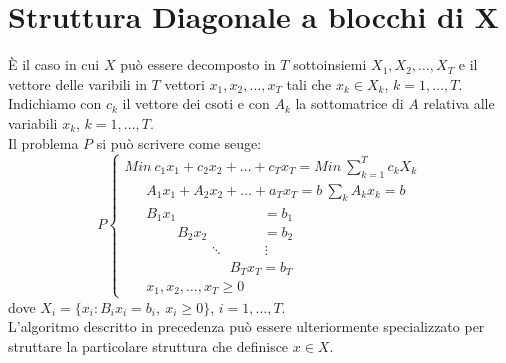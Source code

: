 \section{Struttura Diagonale a blocchi di X}
È il caso in cui $X$ può essere decomposto in $T$ sottoinsiemi $X_{1},X_{2},\dots,X_{T}$ e il vettore delle varibili in $T$ vettori $x_{1},x_{2},\dots,x_{T}$ tali che $x_{k}\in X_{k}$, $k=1,\dots,T$.\\
Indichiamo con $c_{k}$ il vettore dei csoti e con $A_{k}$ la sottomatrice di $A$ relativa alle variabili $x_{k}$, $k=1,\dots,T$.\\
Il problema $P$ si può scrivere come seuge:
\begin{equation*}
	P
	\begin{cases}
	Min\ c_{1}x_{1}+c_{2}x_{2}+\dots+c_{T}x_{T}=Min\ \sum_{k=1}^{T}c_{k}X_{k} \\
	\ \ \ \ \ \ \ A_{1}x_{1}+A_{2}x_{2}+\dots+a_{T}x_{T}=b\ \sum_{k}A_{k}x_{k}=b \\
	\ \ \ \ \ \ \ B_{1}x_{1}\ \ \ \ \ \ \ \ \ \ \ \ \ \ \ \ \ \ \ \ \ \ \ \ \ \ \ \ =b_{1} \\
	\ \ \ \ \ \ \ \ \ \ \ \ \ \ \ \ \ B_{2}x_{2}\ \ \ \ \ \ \ \ \ \ \ \ \ \ \ \ \ \ =b_{2} \\
	\ \ \ \ \ \ \ \ \ \ \ \ \ \ \ \ \ \ \ \ \ \ \ \ \ \ \ \ddots\ \ \ \ \ \ \ \ \ \ \ \ \ \vdots \\
	\ \ \ \ \ \ \ \ \ \ \ \ \ \ \ \ \ \ \ \ \ \ \ \ \ \ \ \ \ \ \ \ \ \ B_{T}x_{T}=b_{T}\\
	\ \ \ \ \ \ \ x_{1},x_{2},\dots,x_{T}\ge 0
	\end{cases}
\end{equation*}
dove $X_{i}=\{x_{i}:B_{i}x_{i}=b_{i},\ x_{i}\ge 0\}$, $i=1,\dots,T$.\\
L'algoritmo descritto in precedenza può essere ulteriormente specializzato per struttare la particolare struttura che definisce $x\in X$.

